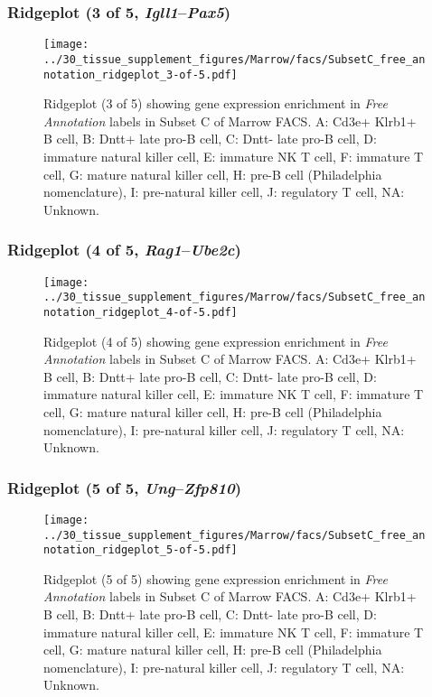 \clearpage

\subsubsection{Ridgeplot (3 of 5, \emph{Igll1}--\emph{Pax5})}
\begin{figure}[h]
\centering
\texttt{[image: ../30\_tissue\_supplement\_figures/Marrow/facs/SubsetC\_free\_annotation\_ridgeplot\_3-of-5.pdf]}

\caption{ Ridgeplot (3 of 5)  showing gene expression enrichment in \emph{Free Annotation} labels in Subset C of Marrow FACS. A: Cd3e+ Klrb1+ B cell, B: Dntt+ late pro-B cell, C: Dntt- late pro-B cell, D: immature natural killer cell, E: immature NK T cell, F: immature T cell, G: mature natural killer cell, H: pre-B cell (Philadelphia nomenclature), I: pre-natural killer cell, J: regulatory T cell, NA: Unknown.}
\end{figure}


\clearpage

\subsubsection{Ridgeplot (4 of 5, \emph{Rag1}--\emph{Ube2c})}
\begin{figure}[h]
\centering
\texttt{[image: ../30\_tissue\_supplement\_figures/Marrow/facs/SubsetC\_free\_annotation\_ridgeplot\_4-of-5.pdf]}

\caption{ Ridgeplot (4 of 5)  showing gene expression enrichment in \emph{Free Annotation} labels in Subset C of Marrow FACS. A: Cd3e+ Klrb1+ B cell, B: Dntt+ late pro-B cell, C: Dntt- late pro-B cell, D: immature natural killer cell, E: immature NK T cell, F: immature T cell, G: mature natural killer cell, H: pre-B cell (Philadelphia nomenclature), I: pre-natural killer cell, J: regulatory T cell, NA: Unknown.}
\end{figure}


\clearpage

\subsubsection{Ridgeplot (5 of 5, \emph{Ung}--\emph{Zfp810})}
\begin{figure}[h]
\centering
\texttt{[image: ../30\_tissue\_supplement\_figures/Marrow/facs/SubsetC\_free\_annotation\_ridgeplot\_5-of-5.pdf]}

\caption{ Ridgeplot (5 of 5)  showing gene expression enrichment in \emph{Free Annotation} labels in Subset C of Marrow FACS. A: Cd3e+ Klrb1+ B cell, B: Dntt+ late pro-B cell, C: Dntt- late pro-B cell, D: immature natural killer cell, E: immature NK T cell, F: immature T cell, G: mature natural killer cell, H: pre-B cell (Philadelphia nomenclature), I: pre-natural killer cell, J: regulatory T cell, NA: Unknown.}
\end{figure}


